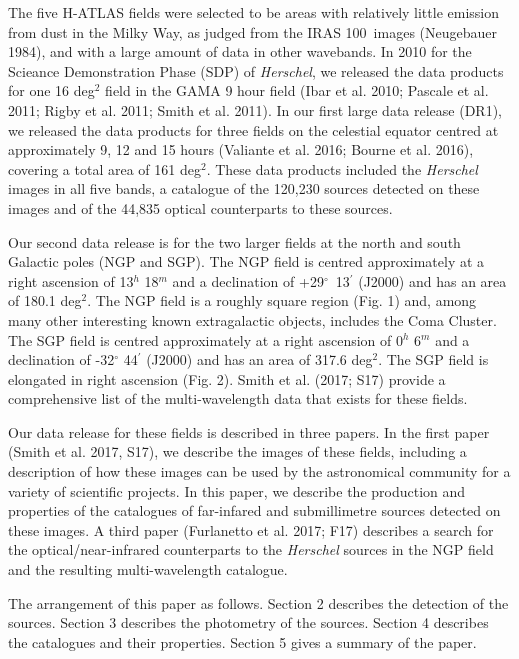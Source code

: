 \documentclass[useAMS,usenatbib]{mnras}
\begin{document}
The five H-ATLAS fields were selected to be areas with relatively little emission
from dust in the Milky Way, as judged from the IRAS 100\micron\ images (Neugebauer
1984), and with a large
amount of data in other wavebands. In 2010 for the 
Scieance Demonstration Phase (SDP) of {\it Herschel}, we released the data
products
for one
16 deg$^2$ field in the GAMA 9 hour 
field (Ibar et al. 2010; Pascale et al. 2011; Rigby et al. 2011; Smith et
al. 2011).
In our first large data release (DR1), we released
the data products for 
three fields
on the celestial equator centred at 
approximately 9, 12 and 15 hours (Valiante et al. 2016; Bourne et al.
2016), covering
a total area of 161 deg$^2$.
These data products included the {\it Herschel} images in all five bands,
a catalogue of the 120,230 
sources detected on these images and of the 44,835 optical counterparts to
these sources.

Our second data release is for the two larger fields at the north and south Galactic
poles (NGP and SGP). The NGP field is centred 
approximately at a right ascension of 13$^{h}$ 18$^{m}$ and
a declination of +29$^{\circ}$\ 13$^{\prime}$ (J2000) and has
an area of 180.1 deg$^2$. 
The NGP field is a roughly square region
(Fig. 1) and, among many other interesting known
extragalactic objects, includes the Coma Cluster.
The SGP field is centred approximately at a right ascension of 0$^{h}$ 6$^{m}$ and a declination of -32$^{\circ}$ 44$^{\prime}$ (J2000)
and has an area of 317.6 deg$^2$. The SGP field is elongated
in right ascension (Fig. 2).
Smith et al. (2017; S17) provide a comprehensive list
of the multi-wavelength data that exists for these fields.

Our data release for these fields is
described in three papers. In the first paper (Smith et al. 2017, S17), we describe
the images of these fields, including a description of how these
images can be used by the astronomical community for a variety of scientific
projects.
In this paper, we describe the production and
properties of the catalogues of 
far-infared and submillimetre sources detected on these images. A third paper
(Furlanetto et al. 2017; F17) describes a search for the optical/near-infrared counterparts
to the {\it Herschel} sources in the NGP field and the resulting multi-wavelength catalogue.

The arrangement of this paper as follows. Section 2 
describes the
detection of the sources. Section 3 describes the 
photometry of the sources. Section 4 describes the catalogues
and their properties.
Section 5 gives a summary of the paper.
\end{document}

